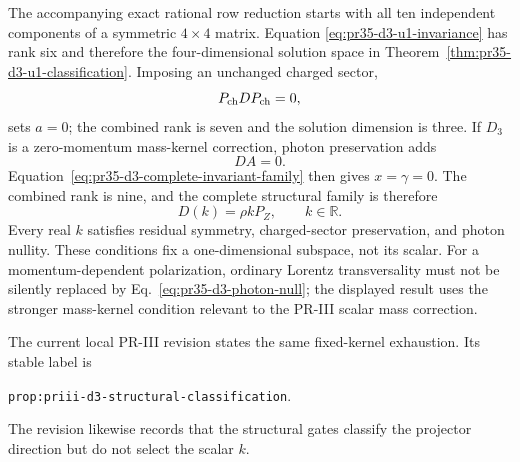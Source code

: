 The accompanying exact rational row reduction starts with all ten independent components of a symmetric $4\times4$ matrix.  Equation \eqref{eq:pr35-d3-u1-invariance} has rank six and therefore the four-dimensional solution space in Theorem~\ref{thm:pr35-d3-u1-classification}.  Imposing an
unchanged charged sector,
\begin{equation}
 P_{\rm ch}DP_{\rm ch}=0,
 \label{eq:pr35-d3-charged-unchanged}
\end{equation}
sets $a=0$; the combined rank is seven and the solution dimension is three. If $D_3$ is a zero-momentum mass-kernel correction, photon preservation adds
\begin{equation}
 DA=0.
 \label{eq:pr35-d3-photon-null}
\end{equation}
Equation~\eqref{eq:pr35-d3-complete-invariant-family} then gives $x=\gamma=0$.  The combined rank is nine, and the complete structural family is therefore
\begin{equation}
 D(k)=\rho kP_Z,\qquad k\in\mathbb R.
 \label{eq:pr35-d3-all-real-k-family}
\end{equation}
Every real $k$ satisfies residual symmetry, charged-sector preservation, and photon nullity.  These conditions fix a one-dimensional subspace, not its scalar.  For a momentum-dependent polarization, ordinary Lorentz transversality must not be silently replaced by Eq.~\eqref{eq:pr35-d3-photon-null}; the displayed result uses the stronger mass-kernel condition relevant to the PR-III scalar mass
correction.

The current local PR-III revision states the same fixed-kernel exhaustion.  Its stable label is
\begin{center}
\texttt{prop:priii-d3-structural-classification}.
\end{center}
The revision likewise records that the structural gates classify the projector direction but do not select the scalar $k$.

